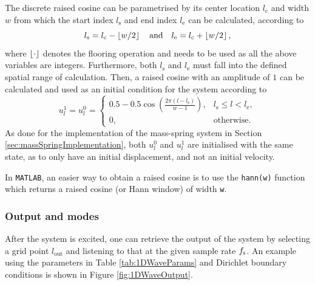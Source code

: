 The discrete raised cosine can be parametrised by its center location $l_\text{c}$ and width $w$ from which the start index $l_\text{s}$ and end index $l_\text{e}$ can be calculated, according to 
\begin{equation}
    l_\text{s} = l_\text{c} - \floor[w/2]\qaq l_\text{e} = l_\text{c} + \floor[w/2],
\end{equation}
where $\floor[\cdot]$ denotes the flooring operation and needs to be used as all the above variables are integers. Furthermore, both $l_\text{s}$ and $l_\text{e}$ must fall into the defined spatial range of calculation. Then, a raised cosine with an amplitude of $1$ can be calculated and used as an initial condition for the system according to
\begin{equation}\label{eq:raisedCos}
    u_l^1 = u_l^0 =
    \begin{cases}
        0.5 - 0.5\cos\left(\frac{2\pi (l - l_\text{s})}{w - 1}\right), & l_\text{s} \leq l < l_\text{e},\\
        0, & \text{otherwise}.
    \end{cases}
\end{equation}
As done for the implementation of the mass-spring system in Section \ref{sec:massSpringImplementation}, both $u_l^0$ and $u^1_l$ are initialised with the same state, as to only have an initial displacement, and not an initial velocity. 

In \texttt{MATLAB}, an easier way to obtain a raised cosine is to use the \texttt{hann(w)} function which returns a raised cosine (or Hann window) of width \texttt{w}.

\subsubsection{Output and modes}
After the system is excited, one can retrieve the output of the system by selecting a grid point $l_\text{out}$ and listening to that at the given sample rate $f_\text{s}$. An example using the parameters in Table \ref{tab:1DWaveParams} and Dirichlet boundary conditions is shown in Figure \ref{fig:1DWaveOutput}.

